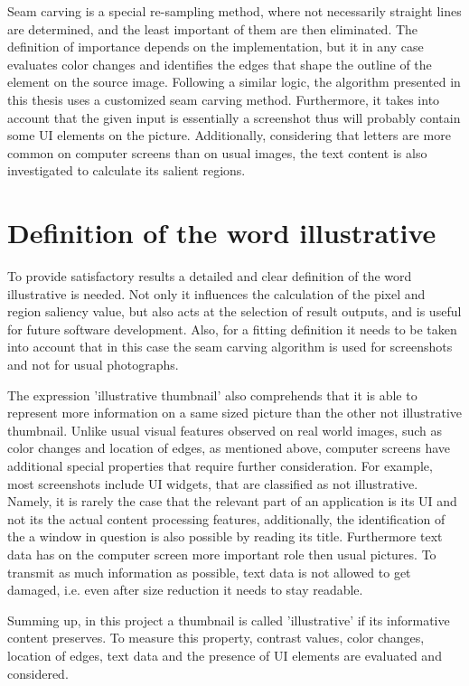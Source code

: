 \documentclass[draft,final]{vutinfth} %
\begin{document}
	Seam carving is a special re-sampling method, where not necessarily straight lines are determined, and the least important of them are then eliminated.
	The definition of importance depends on the implementation, but it in any case evaluates color changes and identifies the edges that shape the outline of the element on the source image.
	Following a similar logic, the algorithm presented in this thesis uses a customized seam carving method.
	Furthermore, it takes into account that the given input is essentially a screenshot thus will probably contain some UI elements on the picture.
	Additionally, considering that letters are more common on computer screens than on usual images, the text content is also investigated to calculate its salient regions.
	
	\section{Definition of the word illustrative} 
	To provide satisfactory results a detailed and clear definition of the word illustrative is needed.
	Not only it influences the calculation of the pixel and region saliency value, but also acts at the selection of result outputs, and is useful for future software development.
	Also, for a fitting definition it needs to be taken into account that in this case the seam carving algorithm is used for screenshots and not for usual photographs.\par 
	The expression 'illustrative thumbnail' also comprehends that it is able to represent more information on a same sized picture than the other not illustrative thumbnail.
	Unlike usual visual features observed on real world images, such as color changes and location of edges, as mentioned above, computer screens have additional special properties that require further consideration.
	For example, most screenshots include UI widgets, that are classified as not illustrative.
	Namely, it is rarely the case that the relevant part of an application is its UI and not its the actual content processing features, additionally, the identification of the a window in question is also possible by reading its title.
	Furthermore text data has on the computer screen more important role then usual pictures.
	To transmit as much information as possible, text data is not allowed to get damaged, i.e. even after size reduction it needs to stay readable.\par 
	Summing up, in this project a thumbnail is called 'illustrative' if its informative content preserves.
	To measure this property, contrast values, color changes, location of edges, text data and the presence of UI elements are evaluated and considered.            
	
\end{document}
